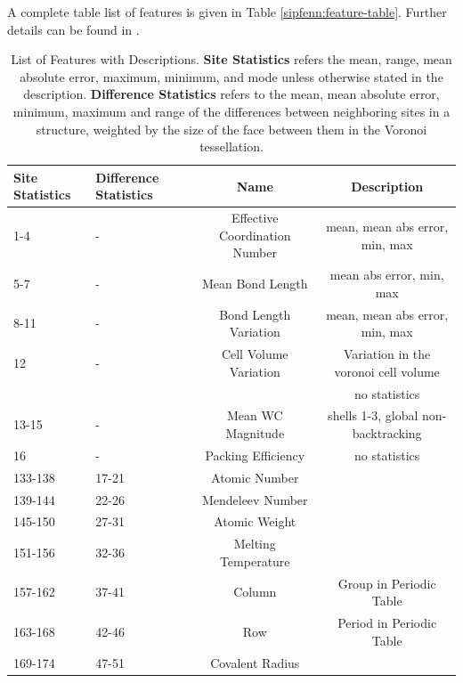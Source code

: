 A complete table list of features is given in Table \ref{sipfenn:feature-table}. Further details can be found in \cite{Ward2016AMaterials, Ward2017IncludingTessellations}.

\begin{table}[H]
    \footnotesize
    \centering
    \caption{List of Features with Descriptions. \textbf{Site Statistics} refers the mean, range, mean absolute error, maximum, minimum, and mode unless otherwise stated in the description. \textbf{Difference Statistics} refers to the mean, mean absolute error, minimum, maximum and range of the differences between neighboring sites in a structure, weighted by the size of the face between them in the Voronoi tessellation. }
    \begin{tabular}{|p{2cm}|p{2cm}|c|c|}
        \hline
        \textbf{Site \hspace{0.3cm} Statistics} & \textbf{Difference \hspace{0.3cm} Statistics} & \textbf{Name} & \textbf{Description} \\
        \hline
        1-4 & - & Effective Coordination Number & mean, mean abs error, min, max\\
        \hline
        5-7 & - & Mean Bond Length & mean abs error, min, max\\
        \hline
        8-11 & - & Bond Length Variation & mean, mean abs error, min, max \\
        \hline
        12 & - & Cell Volume Variation & Variation in the voronoi cell volume\\
        & & & no statistics \\
        \hline
        13-15 & - & Mean WC Magnitude & shells 1-3, global non-backtracking \\
        \hline
        16 & - & Packing Efficiency & no statistics \\
        \hline
        133-138 & 17-21 & Atomic Number & \\
        \hline
        139-144 & 22-26 & Mendeleev Number & \\ 
        \hline
        145-150 & 27-31 & Atomic Weight & \\ 
        \hline
        151-156 & 32-36 & Melting Temperature & \\ 
        \hline
        157-162 & 37-41 & Column & Group in Periodic Table \\ 
        \hline
        163-168 & 42-46 & Row & Period in Periodic Table\\ 
        \hline
        169-174 & 47-51 & Covalent Radius & \\ 

\end{tabular}
\end{table}
